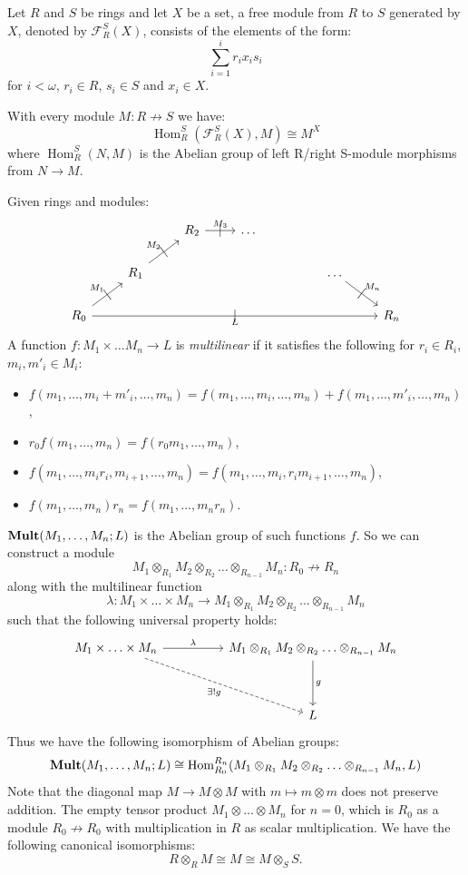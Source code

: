 \documentclass[8pt]{article}
\theoremstyle{definition}
\theoremstyle{definition}
\theoremstyle{definition}
\theoremstyle{definition}
\theoremstyle{definition}
\theoremstyle{definition}
\theoremstyle{definition}
\theoremstyle{definition}
\theoremstyle{definition}
\theoremstyle{definition}
\theoremstyle{definition}
\theoremstyle{definition}
\theoremstyle{definition}
\theoremstyle{definition}
\theoremstyle{question}
\begin{document}
Let $R$ and $S$ be rings and let $X$ be a set, a free module from $R$ to $S$ generated by $X$, denoted
by $\mathcal{F}^{S}_R(X)$, consists of the elements of the form:
\[
\sum \limits_{i = 1}^{i} r_i x_i s_i
\]
for $i < \omega$, $r_i \in R$, $s_i \in S$ and $x_i \in X$.

With every module $M : R \not\to S$ we have:
\[
\operatorname{Hom}^S_R(\mathcal{F}^{S}_R(X), M) \cong M^X
\] 
where $\operatorname{Hom}^S_R(N, M)$ is the Abelian group of left R/right S-module morphisms from $N \to M$.

Given rings and modules:
\[
\begin{tikzcd}
&& R_2 \ar[r, "M_3", "|" marking] & \ldots \\ 
& R_1 \ar[ur, "M_2", "|" marking] &&&& \ldots \ar[dr, "M_n", "|" marking] \\
R_0 \ar[ur, "M_1", "|" marking] \ar[rrrrrr, "|" marking, "L"'] &&&&&& R_n
\end{tikzcd}
\]
A function $f : M_1 \times \ldots M_n \to L$ is \emph{multilinear} if it satisfies the following
for $r_i \in R_i$, $m_i, m'_i \in M_i$:
\begin{itemize}
  \item $f(m_1, \ldots, m_i + m'_i, \ldots, m_n) = f(m_1, \ldots, m_i, \ldots, m_n) + f(m_1, \ldots, m'_i, \ldots, m_n)$,
  \item $r_0 f(m_1, \ldots, m_n) = f(r_0 m_1, \ldots, m_n)$,
  \item $f(m_1, \ldots, m_i r_i, m_{i +1}, \ldots, m_n) = f(m_1, \ldots, m_i, r_i m_{i +1}, \ldots, m_n)$,
  \item $f(m_1, \ldots, m_n) r_n = f(m_1, \ldots, m_n r_n)$.
\end{itemize}

${\bf Mult}(M_1, \ldots, M_n; L)$ is the Abelian group of such functions $f$. So we can construct a module
\[
M_1 \otimes_{R_1} M_2 \otimes_{R_2} \ldots \otimes_{R_{n - 1}} M_n : R_0 \not\to R_n
\]
along with the multilinear function
\[
\lambda : M_1 \times \ldots \times M_n \to M_1 \otimes_{R_1} M_2 \otimes_{R_2} \ldots \otimes_{R_{n - 1}} M_n
\]
such that the following universal property holds:
\[
\begin{tikzcd}
M_1 \times \ldots \times M_n \ar[rr, "\lambda"] \ar[ddrr,  dashed, "\exists ! g"'] && M_1 \otimes_{R_1} M_2 \otimes_{R_2} \ldots \otimes_{R_{n - 1}} M_n \ar[dd, "g"] \\
\\
&& L
\end{tikzcd}
\]
Thus we have the following isomorphism of Abelian groups:
\[
{\bf Mult}(M_1, \ldots, M_n; L) \cong \operatorname{Hom}^{R_n}_{R_0}(M_1 \otimes_{R_1} M_2 \otimes_{R_2} \ldots \otimes_{R_{n - 1}} M_n, L)
\]
Note that the diagonal map $M \to M \otimes M$ with $m \mapsto m \otimes m$ does not preserve addition. The empty tensor 
product $M_1 \otimes \ldots \otimes M_n$ for $n = 0$, which is $R_0$ as a module $R_0 \not\to R_0$
with multiplication in $R$ as scalar multiplication. We have the following canonical isomorphisms:
\[
R \otimes_R M \cong M \cong M \otimes_S S.
\]
\end{document}
